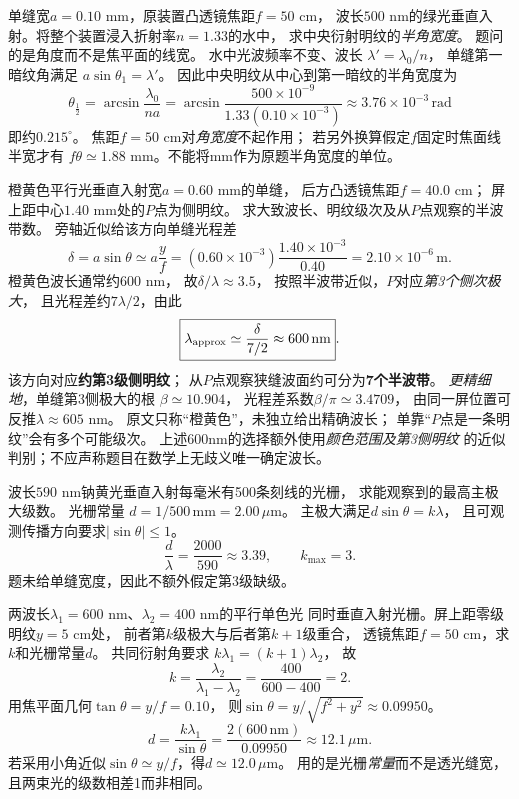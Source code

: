 \problemtext 单缝宽$a=0.10$ mm，原装置凸透镜焦距$f=50$ cm，
波长$500$ nm的绿光垂直入射。将整个装置浸入折射率$n=1.33$的水中，
求中央衍射明纹的\emph{半角宽度}。
\workings
题问的是角度而不是焦平面的线宽。
水中光波频率不变、波长
$\lambda'=\lambda_0/n$，
单缝第一暗纹角满足
$a\sin\theta_1=\lambda'$。
因此中央明纹从中心到第一暗纹的半角宽度为
\[
\boxed{\theta_{\frac12}
=\arcsin\frac{\lambda_0}{na}
=\arcsin\frac{500\times10^{-9}}{1.33(0.10\times10^{-3})}
\approx3.76\times10^{-3}\,\mathrm{rad}}
\]
即约$\boxed{0.215^\circ}$。
\crosscheck 焦距$f=50$ cm对\emph{角宽度}不起作用；
若另外换算假定$f$固定时焦面线半宽才有
$f\theta\simeq1.88$ mm。不能将mm作为原题半角宽度的单位。

\problemtext 橙黄色平行光垂直入射宽$a=0.60$ mm的单缝，
后方凸透镜焦距$f=40.0$ cm；
屏上距中心$1.40$ mm处的$P$点为侧明纹。
求大致波长、明纹级次及从$P$点观察的半波带数。
\workings
旁轴近似给该方向单缝光程差
\[
\delta=a\sin\theta\simeq a\frac yf
=(0.60\times10^{-3})\frac{1.40\times10^{-3}}{0.40}
=2.10\times10^{-6}\,\mathrm m.
\]
橙黄色波长通常约$600$ nm，
故$\delta/\lambda\approx3.5$，
按照半波带近似，$P$对应\emph{第3个侧次极大}，
且光程差约$7\lambda/2$，由此
\[
\boxed{\lambda_{\rm approx}\simeq
\frac{\delta}{7/2}\approx600\,\mathrm{nm}}.
\]
该方向对应\textbf{约第3级侧明纹}；
从$P$点观察狭缝波面约可分为\textbf{7个半波带}。
\emph{更精细地}，单缝第3侧极大的根
$\beta\simeq10.904$，
光程差系数$\beta/\pi\simeq3.4709$，
由同一屏位置可反推$\lambda\approx605$ nm。
\crosscheck 原文只称“橙黄色”，未独立给出精确波长；
单靠“$P$点是一条明纹”会有多个可能级次。
上述600nm的选择额外使用\emph{颜色范围及第3侧明纹}
的近似判别；不应声称题目在数学上无歧义唯一确定波长。

\problemtext 波长$590$ nm钠黄光垂直入射每毫米有500条刻线的光栅，
求能观察到的最高主极大级数。
\workings
光栅常量
$d=1/500\,\mathrm{mm}=2.00\,\mu\mathrm m$。
主极大满足$d\sin\theta=k\lambda$，
且可观测传播方向要求$|\sin\theta|\le1$。
\[
\frac d\lambda=\frac{2000}{590}\approx3.39,
\qquad\boxed{k_{\max}=3}.
\]
\crosscheck 题未给单缝宽度，因此不额外假定第3级缺级。

\problemtext 两波长$\lambda_1=600$ nm、$\lambda_2=400$ nm的平行单色光
同时垂直入射光栅。屏上距零级明纹$y=5$ cm处，
前者第$k$级极大与后者第$k+1$级重合，
透镜焦距$f=50$ cm，求$k$和光栅常量$d$。
\workings
共同衍射角要求
$k\lambda_1=(k+1)\lambda_2$，
故
\[
\boxed{k=\frac{\lambda_2}{\lambda_1-\lambda_2}
=\frac{400}{600-400}=2}.
\]
用焦平面几何$\tan\theta=y/f=0.10$，
则$\sin\theta=y/\sqrt{f^2+y^2}\approx0.09950$。
\[
\boxed{d=\frac{k\lambda_1}{\sin\theta}
=\frac{2(600\,\mathrm{nm})}{0.09950}
\approx12.1\,\mu\mathrm m}.
\]
若采用小角近似$\sin\theta\simeq y/f$，得$d\simeq12.0\,\mu$m。
\crosscheck 用的是光栅\emph{常量}而不是透光缝宽，
且两束光的级数相差1而非相同。
